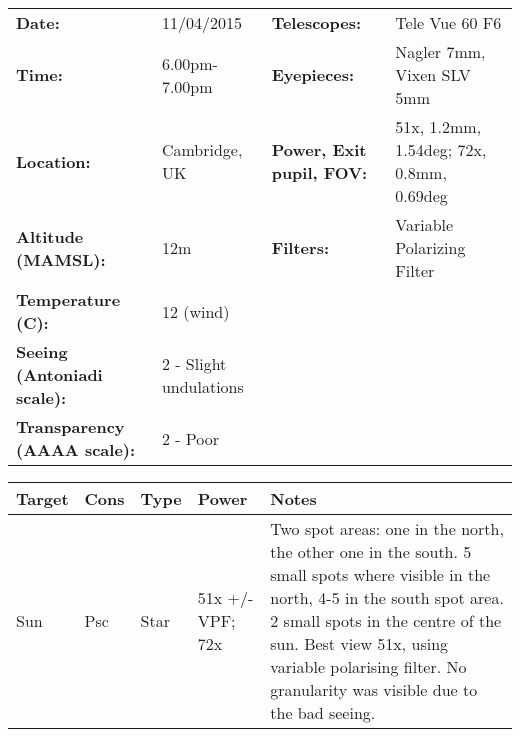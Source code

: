 \begin{tabular}{ p{1.7in} p{1.2in} p{1.5in} p{4.2in}}
{\bf Date:} & 11/04/2015 & {\bf Telescopes:} & Tele Vue 60 F6 \\ 
{\bf Time:} & 6.00pm-7.00pm & {\bf Eyepieces:} & Nagler 7mm, Vixen SLV 5mm \\ 
{\bf Location:} & Cambridge, UK & {\bf Power, Exit pupil, FOV:} & 51x, 1.2mm, 1.54deg; 72x, 0.8mm, 0.69deg \\ 
{\bf Altitude (MAMSL):} & 12m & {\bf Filters:} & Variable Polarizing Filter \\ 
{\bf Temperature (C):} & 12 (wind) & & \\ 
{\bf Seeing (Antoniadi scale):} & 2 - Slight undulations & & \\ 
{\bf Transparency (AAAA scale):} & 2 - Poor & & \\ 
\end{tabular}
\centering 
\begin{longtable}{ p{0.8in}  p{0.3in}  p{0.5in}  p{0.9in}  p{5.8in} }
\hline 
{\bf Target} & {\bf Cons} & {\bf Type} & {\bf Power} & {\bf Notes} \\ 
\hline 
Sun & Psc & Star & 51x +/- VPF; 72x & Two spot areas: one in the north, the other one in the south. 5 small spots where visible in the north, 4-5 in the south spot area. 2 small spots in the centre of the sun. Best view 51x, using variable polarising filter. No granularity was visible due to the bad seeing. \\ 
\hline 
\end{longtable} 
